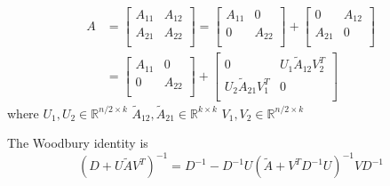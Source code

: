 \begin{align*}
    A &=
    \begin{bmatrix}
       A_{11} & A_{12} \\
       A_{21} & A_{22} \\
    \end{bmatrix}
    =
    \begin{bmatrix}
       A_{11} & 0 \\
       0 & A_{22} \\
    \end{bmatrix}
    +
    \begin{bmatrix}
       0 & A_{12} \\
       A_{21} & 0 \\
    \end{bmatrix}
    \\
    &=
    \begin{bmatrix}
       A_{11} & 0 \\
       0 & A_{22} \\
    \end{bmatrix}
    +
    \begin{bmatrix}
       0 & U_1\widetilde{A}_{12}V_2^T \\
       U_2\widetilde{A}_{21}V_1^T& 0 \\
    \end{bmatrix}
\end{align*}
where $U_1, U_2 \in \mathbb{R}^{n/2 \times k}$ \quad $\widetilde{A}_{12}, \widetilde{A}_{21}\in \mathbb{R}^{k \times k}$ \quad $V_1, V_2 \in \mathbb{R}^{n/2 \times k}$
\begin{center}
    
\end{center}

The Woodbury identity is
\begin{equation*}
\left( D + U\widetilde{A}V^T\right)^{-1}
=
D^{-1}  - D^{-1}U\left(\widetilde{A} + V^TD^{-1}U \right)^{-1}VD^{-1}
\end{equation*}

